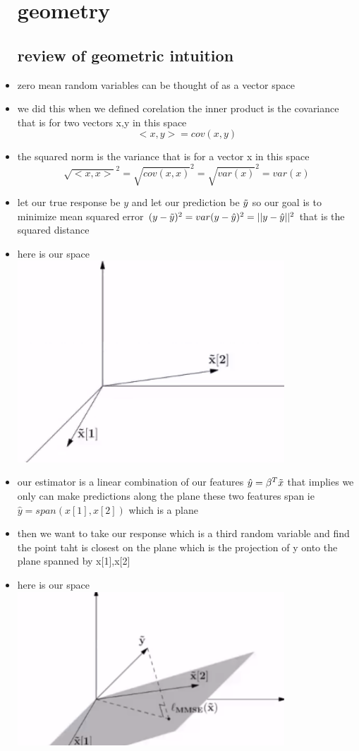 \documentclass{article}
\begin{document}
\begin{itemize}
\section*{geometry}
\subsection*{review of geometric intuition}
\item zero mean random variables can be thought of as a vector space
\item we did this when we defined corelation the inner product is the covariance that is for two vectors x,y in this space 
$$<x,y>=cov(x,y)$$
\item the squared norm is the variance that is for a vector x in this space $$\sqrt{<x,x>}^2=\sqrt{cov(x,x)}^2=\sqrt{var(x)}^2=var(x)$$
\item let our true response be $y$ and let our prediction be $\Tilde{y}$ so our goal is to minimize mean squared error 
$(y-\Tilde{y})^2=var(y-\hat{y})^2=||y-\hat{y}||^2$ that is the squared distance
\item here is our space \\ \includegraphics*[width=10cm]{notes/week_11/immages/w11_4.png}
\item our estimator is a linear combination of our features $\hat{y}=\beta^T\Tilde{x}$ that implies we only can make 
predictions along the plane these two features span ie $\hat{y}=span(x[1], x[2])$ which is a plane 
\item then we want to take our response which is a third random variable and find the point taht is closest on the plane
which is the projection of y onto the plane spanned by x[1],x[2]
\item here is our space \\ \includegraphics*[width=10cm]{notes/week_11/immages/w11_5.png}

\end{itemize}
\end{document}
